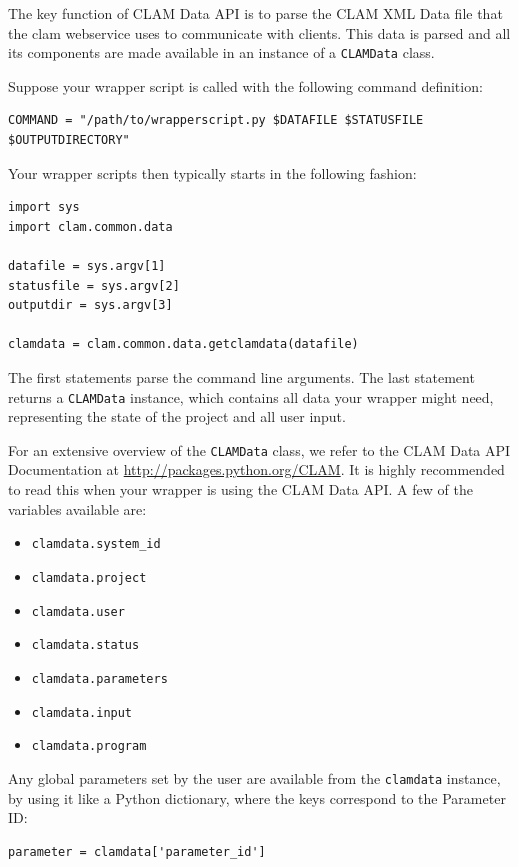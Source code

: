 \documentclass[a4paper,12pt,twoside,openright]{report}
\begin{document}
The key function of CLAM Data API is to parse the CLAM XML Data file that the
clam webservice uses to communicate with clients. This data is parsed and all
its components are made available in an instance of a \texttt{CLAMData} class.

Suppose your wrapper script is called with the following command definition:

{\footnotesize
\begin{verbatim}
COMMAND = "/path/to/wrapperscript.py $DATAFILE $STATUSFILE $OUTPUTDIRECTORY" 
\end{verbatim}}


Your wrapper scripts then typically starts in the following fashion:


{ \small
\begin{verbatim}
import sys
import clam.common.data

datafile = sys.argv[1]
statusfile = sys.argv[2]
outputdir = sys.argv[3]

clamdata = clam.common.data.getclamdata(datafile)
\end{verbatim}
}

The first statements parse the command line arguments. The last statement
returns a \texttt{CLAMData} instance, which contains all data your wrapper might need,
representing the state of the project and all user input.

For an extensive overview of the \texttt{CLAMData} class, we refer to the CLAM
Data API Documentation at \url{http://packages.python.org/CLAM}. It is highly
recommended to read this when your wrapper is using the CLAM Data API. A few of the
variables available are:

\begin{itemize}
\item \texttt{clamdata.system\_id}
\item \texttt{clamdata.project}
\item \texttt{clamdata.user}
\item \texttt{clamdata.status}
\item \texttt{clamdata.parameters}
\item \texttt{clamdata.input}
\item \texttt{clamdata.program}
\end{itemize}

Any global parameters set by the user are available from the \texttt{clamdata} instance, by
using it like a Python dictionary, where the keys correspond to the Parameter ID:

{ \small
\begin{verbatim}
parameter = clamdata['parameter_id']
\end{verbatim}
}
\end{document}
